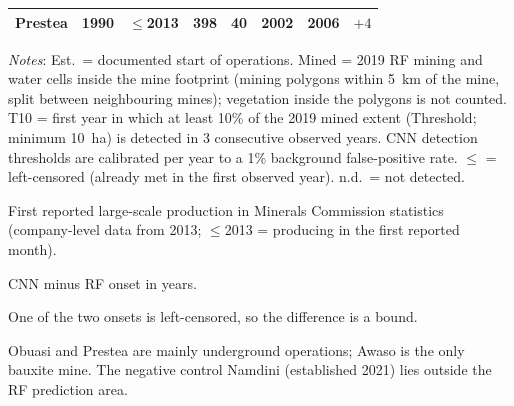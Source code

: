 \documentclass[]{interact}
\begin{document}
\begin{table}[H]
\begin{threeparttable}
\begin{tabular}{@{}lrlrrccr@{}}
Prestea & 1990 & $\leq$2013 & 398 & 40 & 2002 & 2006 & $+4$ \\
\bottomrule
\end{tabular}
\begin{tablenotes}[flushleft]
\footnotesize
\item \textit{Notes}: Est.\ = documented start of operations. Mined = 2019
RF mining and water cells inside the mine footprint (mining polygons within
5~km of the mine, split between neighbouring mines); vegetation inside the
polygons is not counted. T10 = first year in which at least 10\% of the 2019
mined extent (Threshold; minimum 10~ha) is detected in 3 consecutive
observed years. CNN detection thresholds are calibrated per year to a 1\%
background false-positive rate. $\leq$ = left-censored (already met in the
first observed year). n.d.\ = not detected.
\item[a] First reported large-scale production in Minerals Commission
statistics (company-level data from 2013; $\leq$2013 = producing in the
first reported month).
\item[b] CNN minus RF onset in years.
\item[c] One of the two onsets is left-censored, so the difference is a bound.
\item[d] Obuasi and Prestea are mainly underground operations; Awaso is the
only bauxite mine. The negative control Namdini (established 2021) lies
outside the RF prediction area.
\end{tablenotes}
\end{threeparttable}
\end{table}
\end{document}
